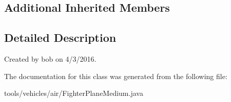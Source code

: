 \subsection*{Additional Inherited Members}


\subsection{Detailed Description}
Created by bob on 4/3/2016. 

The documentation for this class was generated from the following file\+:\begin{DoxyCompactItemize}
\item 
tools/vehicles/air/Fighter\+Plane\+Medium.\+java\end{DoxyCompactItemize}
